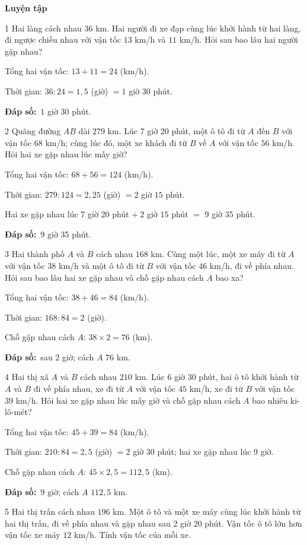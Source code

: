\documentclass[11pt]{article}
\newif\ifsol \solfalse
\providecommand{\AnsWord}{Đáp số}
\newcommand{\dapso}[1]{\par\textbf{\AnsWord:}\ #1}
\newcommand{\probsol}[1]{%
  \begin{lrbox}{\solmeasure}\begin{minipage}{\dimexpr\linewidth-24pt\relax}#1\end{minipage}\end{lrbox}%
  \ifsol
    \begin{solbox}#1\end{solbox}%
  \else
    \setlength{\solht}{\dimexpr\ht\solmeasure+\dp\solmeasure+0.85cm\relax}%
    \ifdim\solht<1.35cm\setlength{\solht}{1.35cm}\fi
    \begin{tcolorbox}[colback=white,colframe=Line,boxrule=0.8pt,arc=5pt,
      left=8pt,right=8pt,top=4pt,bottom=4pt,height=\solht]{\footnotesize\color{Slate}\itshape\WorkWord}\end{tcolorbox}%
  \fi}
\newcommand{\dividerbar}[1]{\par\vspace{0.6em}\noindent
  \begin{tcolorbox}[enhanced,frame hidden,interior hidden,borderline west={5pt}{0pt}{ProbBlue},
    colback=white,left=12pt,right=12pt,top=5pt,bottom=5pt,arc=4pt]
  {\large\bfseries\color{ProbBlue} #1}\end{tcolorbox}\vspace{0.4em}}
\newcommand{\gap}{\vspace{0.3cm}}
\def\WorkWord{Bài làm:}
\def\AnsWord{Đáp số}
\begin{document}
\dividerbar{Luyện tập}
\begin{probbox}{1}{\relax}
Hai làng cách nhau $36$ km. Hai người đi xe đạp cùng lúc khởi hành từ hai làng, đi ngược chiều nhau với vận tốc $13$ km/h và $11$ km/h. Hỏi sau bao lâu hai người gặp nhau?
\end{probbox}
\probsol{
Tổng hai vận tốc: $13+11=24$ (km/h).\par Thời gian: $36:24=1{,}5$ (giờ) $=1$ giờ $30$ phút.
\dapso{$1$ giờ $30$ phút.}}
\gap
\begin{probbox}{2}{\relax}
Quãng đường $AB$ dài $279$ km. Lúc 7 giờ 20 phút, một ô tô đi từ $A$ đến $B$ với vận tốc $68$ km/h; cùng lúc đó, một xe khách đi từ $B$ về $A$ với vận tốc $56$ km/h. Hỏi hai xe gặp nhau lúc mấy giờ?
\end{probbox}
\probsol{
Tổng hai vận tốc: $68+56=124$ (km/h).\par Thời gian: $279:124=2{,}25$ (giờ) $=2$ giờ $15$ phút.\par Hai xe gặp nhau lúc 7 giờ 20 phút $+\ 2$ giờ $15$ phút $=$ 9 giờ 35 phút.
\dapso{9 giờ 35 phút.}}
\gap
\begin{probbox}{3}{\relax}
Hai thành phố $A$ và $B$ cách nhau $168$ km. Cùng một lúc, một xe máy đi từ $A$ với vận tốc $38$ km/h và một ô tô đi từ $B$ với vận tốc $46$ km/h, đi về phía nhau. Hỏi sau bao lâu hai xe gặp nhau và chỗ gặp nhau cách $A$ bao xa?
\end{probbox}
\probsol{
Tổng hai vận tốc: $38+46=84$ (km/h).\par Thời gian: $168:84=2$ (giờ).\par Chỗ gặp nhau cách $A$: $38\times2=76$ (km).
\dapso{sau $2$ giờ; cách $A$ $76$ km.}}
\gap
\begin{probbox}{4}{\relax}
Hai thị xã $A$ và $B$ cách nhau $210$ km. Lúc 6 giờ 30 phút, hai ô tô khởi hành từ $A$ và $B$ đi về phía nhau, xe đi từ $A$ với vận tốc $45$ km/h, xe đi từ $B$ với vận tốc $39$ km/h. Hỏi hai xe gặp nhau lúc mấy giờ và chỗ gặp nhau cách $A$ bao nhiêu ki-lô-mét?
\end{probbox}
\probsol{
Tổng hai vận tốc: $45+39=84$ (km/h).\par Thời gian: $210:84=2{,}5$ (giờ) $=2$ giờ $30$ phút; hai xe gặp nhau lúc 9 giờ.\par Chỗ gặp nhau cách $A$: $45\times2{,}5=112{,}5$ (km).
\dapso{9 giờ; cách $A$ $112{,}5$ km.}}
\gap
\begin{probbox}{5}{\relax}
Hai thị trấn cách nhau $196$ km. Một ô tô và một xe máy cùng lúc khởi hành từ hai thị trấn, đi về phía nhau và gặp nhau sau $2$ giờ $20$ phút. Vận tốc ô tô lớn hơn vận tốc xe máy $12$ km/h. Tính vận tốc của mỗi xe.
\end{probbox}
\end{document}
